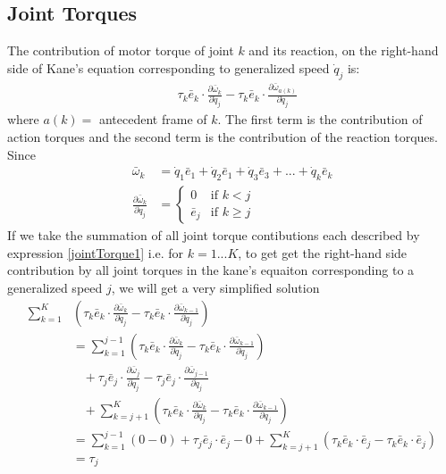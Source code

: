 \documentclass[a4paper,10pt]{article}
\begin{document}
\subsection{Joint Torques}
The contribution of motor torque of joint $k$ and its reaction, on the right-hand side of Kane's equation corresponding to generalized speed 
$\dot{q}_j$ is: 
\begin{align}
 &\tau_k\bar{e}_k \cdot \frac{\partial \bar\omega_k}{\partial \dot{q}_j} - \tau_k\bar{e}_k \cdot \frac{\partial \bar\omega_{a(k)}}{\partial \dot{q}_j} \label{jointTorque1}
\end{align}
where $a(k) =$ antecedent frame of $k$. The first term is the contribution of action torques and the second term is the contribution
of the reaction torques.
Since
\begin{align}
 \bar\omega_k &= \dot{q}_1\bar{e}_1 + \dot{q}_2\bar{e}_1 + \dot{q}_3\bar{e}_3 + ... + \dot{q}_k\bar{e}_k \nonumber \\
 \frac{\partial \bar\omega_k}{\partial \dot{q}_j} &= \begin{cases}
                                                      0         & \mbox{if } k < j \\
                                                      \bar{e}_j & \mbox{if } k \geq j 
                                                     \end{cases} \label{diffOmega}
\end{align}
If we take the summation of all joint torque contibutions each described by expression \ref{jointTorque1} i.e. for $k=1...K$, 
to get get the right-hand side contribution by all joint torques in the kane's equaiton corresponding to a generalized speed $j$, 
we will get a very simplified solution
\begin{align}
  \sum\limits_{k=1}^K &\left( \tau_k\bar{e}_k \cdot \frac{\partial \bar\omega_k}{\partial \dot{q}_j} - \tau_k\bar{e}_k \cdot \frac{\partial \bar\omega_{k-1}}{\partial \dot{q}_j} \right) \nonumber \\   
 &= \sum\limits_{k=1}^{j-1} \left(          \tau_k\bar{e}_k \cdot \frac{\partial \bar\omega_k}{\partial \dot{q}_j} - \tau_k\bar{e}_k \cdot \frac{\partial \bar\omega_{k-1}}{\partial \dot{q}_j}\right) \nonumber \\
      &\;\;\;+                              \tau_j\bar{e}_j \cdot \frac{\partial \bar\omega_j}{\partial \dot{q}_j} - \tau_j\bar{e}_j \cdot \frac{\partial \bar\omega_{j-1}}{\partial \dot{q}_j} \nonumber \\
      &\;\;\;+ \sum\limits_{k=j+1}^K \left( \tau_k\bar{e}_k \cdot \frac{\partial \bar\omega_k}{\partial \dot{q}_j} - \tau_k\bar{e}_k \cdot \frac{\partial \bar\omega_{k-1}}{\partial \dot{q}_j} \right) \nonumber \\
 &= \sum\limits_{k=1}^{j-1} \left(   0 - 0 \right) + \tau_j\bar{e}_j \cdot \bar{e}_j - 0 + \sum\limits_{k=j+1}^K \left( \tau_k\bar{e}_k \cdot \bar{e}_j - \tau_k\bar{e}_k \cdot \bar{e}_j \right) \nonumber \\
 &= \tau_j \label{jointTorque2}
\end{align}
\end{document}
